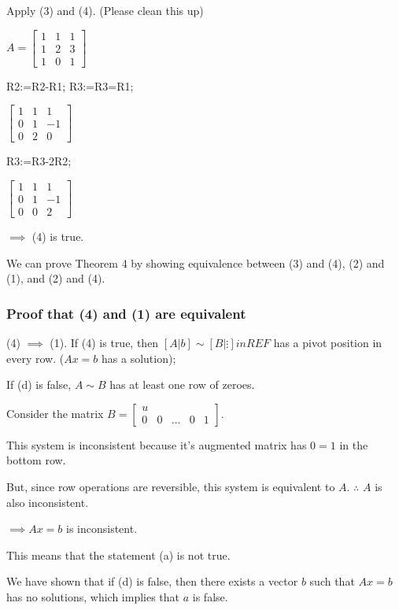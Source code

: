 \documentclass[12pt]{article}
\begin{document}
Apply (3) and (4). (Please clean this up) 

$A=\begin{bmatrix}
  1 & 1 & 1 \\
  1 & 2 & 3 \\
  1 & 0 & 1
\end{bmatrix}$

R2:=R2-R1;
R3:=R3=R1;

$\begin{bmatrix}
  1 & 1 & 1 \\
  0 & 1 & -1 \\
  0 & 2 & 0
\end{bmatrix}$

R3:=R3-2R2;

$\begin{bmatrix}
  1 & 1 & 1 \\
  0 & 1 & -1 \\
  0 & 0 & 2
\end{bmatrix}$

$\implies$ (4) is true.

We can prove Theorem 4 by showing equivalence between (3) and (4), (2) and (1),
and (2) and (4).

\subsubsection{Proof that (4) and (1) are equivalent}

(4) $\implies$ (1). If (4) is true, then $[A|b] \sim [B|\vdots] in REF$ has a pivot
position in every row. ($Ax=b$ has a solution);

If (d) is false, $A\sim B$ has at least one row of zeroes.

Consider the matrix $B=\begin{bmatrix}
  u \\
  0 & 0 & \dots & 0 & 1
\end{bmatrix}$.

This system is inconsistent because it's augmented matrix has $0=1$ in the bottom row.

But, since row operations are reversible, this system is equivalent to $A$.
$\therefore$ $A$ is also inconsistent.

$\implies Ax=b$ is inconsistent.

This means that the statement (a) is not true.

We have shown that if (d) is false, then there exists a vector $b$ such that $Ax=b$
has no solutions, which implies that $a$ is false.
\end{document}
